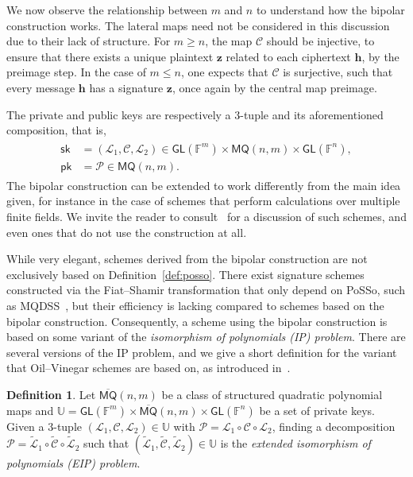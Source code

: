 \documentclass[english]{ufsc-thesis-rn46-2019/ufsc-thesis-rn46-2019}
\theoremstyle{definition}
\newtheorem{definition}[theorem]{Definition}
\begin{document}
We now observe the relationship between $m$ and $n$ to understand how the
bipolar construction works. The lateral maps need not be considered in this
discussion due to their lack of structure. For $m \geq n$, the map
$\mathcal{C}$ should be injective, to ensure that there exists a unique
plaintext $\mathbf{z}$ related to each ciphertext $\mathbf{h}$, by the preimage
step. In the case of $m \leq n$, one expects that $\mathcal{C}$ is surjective,
such that every message $\mathbf{h}$ has a signature $\mathbf{z}$, once again
by the central map preimage.

The private and public keys are respectively a $3$-tuple and its aforementioned
composition, that is,
\begin{align}
  \begin{split}
    \mathsf{sk}
      &= (\mathcal{L}_{1}, \mathcal{C}, \mathcal{L}_{2})
        \in \mathsf{GL}(\mathbb{F}^{m}) \times \mathsf{MQ}(n, m)
          \times \mathsf{GL}(\mathbb{F}^{n}), \\
    \mathsf{pk}
      &= \mathcal{P} \in \mathsf{MQ}(n, m).
  \end{split}
\end{align}
The bipolar construction can be extended to work differently from the main idea
given, for instance in the case of schemes that perform calculations over
multiple finite fields. We invite the reader to
consult~\cite[Sec.~2.2]{Petzoldt:201307} for a discussion of such schemes, and
even ones that do not use the construction at all.

While very elegant, schemes derived from the bipolar construction are not
exclusively based on Definition~\ref{def:posso}. There exist signature schemes
constructed via the Fiat--Shamir transformation that only depend on
\textsf{PoSSo}, such as MQDSS~\cite{Chen:201612}, but their efficiency is
lacking compared to schemes based on the bipolar construction. Consequently,
a scheme using the bipolar construction is based on some variant of the
\emph{isomorphism of polynomials (IP) problem}. There are several versions of
the IP problem, and we give a short definition for the variant that
Oil--Vinegar schemes are based on, as introduced in~\cite{Ding:200806}.

\begin{definition}\label{def:eip}
  Let $\overline{\mathsf{MQ}}(n, m)$ be a class of structured quadratic
  polynomial maps and
  $\mathbb{U} = \mathsf{GL}(\mathbb{F}^{m})
    \times \overline{\mathsf{MQ}}(n, m) \times \mathsf{GL}(\mathbb{F}^{n})$
  be a set of private keys. Given a $3$-tuple
  $(\mathcal{L}_{1}, \mathcal{C}, \mathcal{L}_{2}) \in \mathbb{U}$ with
  $\mathcal{P} = \mathcal{L}_{1} \circ \mathcal{C} \circ \mathcal{L}_{2}$,
  finding a decomposition
  $\mathcal{P} = \widetilde{\mathcal{L}}_{1} \circ \widetilde{\mathcal{C}}
    \circ \widetilde{\mathcal{L}}_{2}$ such that
  $(\widetilde{\mathcal{L}}_{1}, \widetilde{\mathcal{C}},
    \widetilde{\mathcal{L}}_{2}) \in \mathbb{U}$
  is the \emph{extended isomorphism of polynomials (EIP) problem}.
\end{definition}
\end{document}
